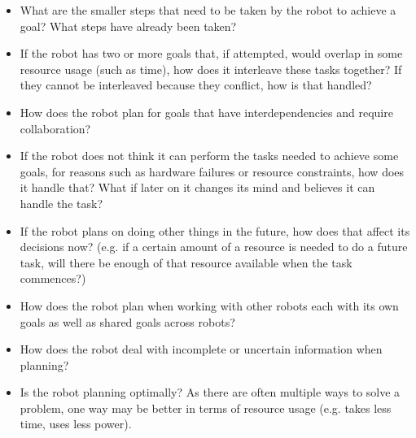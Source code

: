 \begin{itemize}
\item What are the smaller steps that need to be taken by the robot to achieve a goal? What steps have already been taken?
\item If the robot has two or more goals that, if attempted, would overlap in some resource usage (such as time), how does it interleave these tasks together? If they cannot be interleaved because they conflict, how is that handled?
\item How does the robot plan for goals that have interdependencies and require collaboration?
\item If the robot does not think it can perform the tasks needed to achieve some goals, for reasons such as hardware failures or resource constraints, how does it handle that? What if later on it changes its mind and believes it can handle the task?
\item If the robot plans on doing other things in the future, how does that affect its decisions now? (e.g. if a certain amount of a resource is needed to do a future task, will there be enough of that resource available when the task commences?)
\item How does the robot plan when working with other robots each with its own goals as well as shared goals across robots?
\item How does the robot deal with incomplete or uncertain information when planning?
\item Is the robot planning optimally? As there are often multiple ways to solve a problem, one way may be better in terms of resource usage (e.g. takes less time, uses less power).
\end{itemize}

